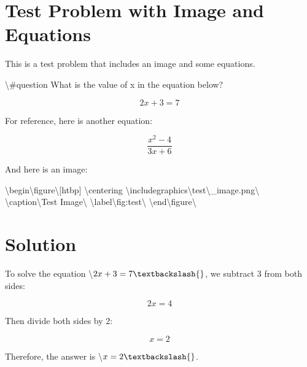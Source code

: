 \documentclass{article}
\begin{document}
\section*{Test Problem with Image and Equations}

This is a test problem that includes an image and some equations.

\textbackslash{}#question What is the value of x in the equation below?

\begin{equation}
2x + 3 = 7
\end{equation}

For reference, here is another equation:

\[
    \frac{x^2-4}{3x+6}
\]

And here is an image:

\textbackslash{}begin\textbackslash{}{figure\textbackslash{}}[htbp]
\textbackslash{}centering
\textbackslash{}includegraphics\textbackslash{}{test\textbackslash{}_image.png\textbackslash{}}
\textbackslash{}caption\textbackslash{}{Test Image\textbackslash{}}
\textbackslash{}label\textbackslash{}{fig:test\textbackslash{}}
\textbackslash{}end\textbackslash{}{figure\textbackslash{}}

\section*{Solution}

To solve the equation \textbackslash{}$2x + 3 = 7\textbackslash{}$, we subtract 3 from both sides:

\begin{equation}
2x = 4
\end{equation}

Then divide both sides by 2:

\begin{equation}
x = 2
\end{equation}

Therefore, the answer is \textbackslash{}$x = 2\textbackslash{}$.
\end{document}

